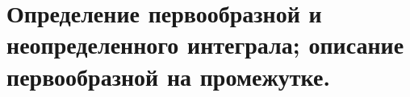 \documentclass[../main.tex]{subfiles}
\begin{document}
\newpage
\section{Определение первообразной и неопределенного интеграла; описание первообразной на промежутке.}
\end{document}
